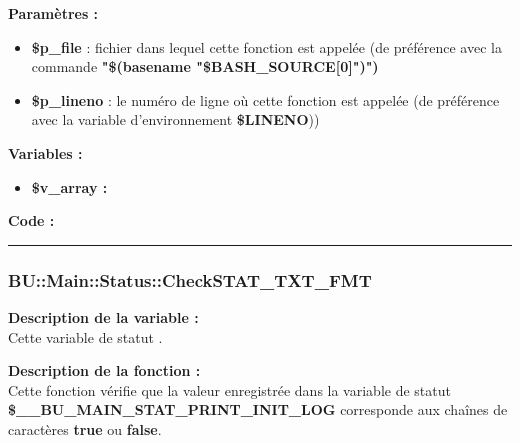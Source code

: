 \documentclass[a4paper,10pt]{article}
\begin{document}
\begin{justify}
    \textbf{Paramètres :}

    \begin{itemize}
        \item \color{orange}\textbf{\$p\_file}\color{white} : fichier dans lequel cette fonction est appelée (de préférence avec la commande \textbf{"\$(\color{gray}basename \color{white}"\color{orange}\$BASH\_SOURCE[0]\color{white}")")}\\

        \item \color{orange}\textbf{\$p\_lineno}\color{white} : le numéro de ligne où cette fonction est appelée (de préférence avec la variable d'environnement \textbf{\color{orange}\$LINENO}))
    \end{itemize}
\end{justify}

\begin{justify}
    \textbf{Variables :}

    \begin{itemize}
        \item \textbf{\color{orange}\$v\_array\color{white} :}
    \end{itemize}
\end{justify}

\begin{justify}
    \textbf{Code :}
\end{justify}



\color{blue}\par\noindent\rule{\textwidth}{0.4pt}\color{white}

\color{blue}
\subsubsection{\color{mauve}BU::Main::Status::CheckSTAT\_TXT\_FMT}\color{white}

\begin{justify}
    \textbf{Description de la variable :}\\
    Cette variable de statut .
\end{justify}

\begin{justify}
    \textbf{Description de la fonction :}\\
    Cette fonction vérifie que la valeur enregistrée dans la variable de statut \textbf{\color{orange}\$\_\_BU\_MAIN\_STAT\_PRINT\_INIT\_LOG} corresponde aux chaînes de caractères \textbf{true} ou \textbf{false}.
\end{justify}
\end{document}
